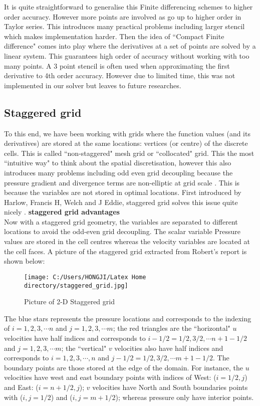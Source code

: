 It is quite straightforward to generalise this Finite differencing schemes to higher order accuracy. However more points are involved as go up to higher order in Taylor series. This introduces many practical problems including larger stencil which makes implementation harder. Then the idea of ``Compact Finite difference" comes into play where the derivatives at a set of points are solved by a linear system. This guarantees high order of accuracy without working with too many points. A 3 point stencil is often used when approximating the first derivative to 4th order accuracy. However due to limited time, this was not implemented in our solver but leaves to future researches.

\subsection{Staggered grid}
To this end, we have been working with grids where the function values (and its derivatives) are stored at the same locations: vertices (or centre) of the discrete cells. This is called ``non-staggered" mesh grid or ``collocated" grid. This the most ``intuitive way" to think about the spatial discretisation, however this also introduces many problems including odd even grid decoupling because the pressure gradient and divergence terms are non-elliptic at grid scale \cite{armfield2000fractional}. This is because the variables are not stored in optimal locations. First introduced by Harlow, Francis H, Welch and J Eddie, staggered grid solves this issue quite nicely \cite{harlow1965numerical}. \textbf{staggered grid advantages}\\

Now with a staggered grid geometry, the variables are separated to different locations to avoid the odd-even grid decoupling. The scalar variable Pressure values are stored in the cell centres whereas the velocity variables are located at the cell faces. A picture of the staggered grid extracted from Robert's report is shown below:

\begin{figure}[H]
	\centering
	\texttt{[image: C:/Users/HONGJI/Latex Home directory/staggered\_grid.jpg]}
	\caption{Picture of 2-D Staggered grid}\label{fig:6.1}
\end{figure}
The blue stars represents the pressure locations and corresponds to the indexing of $i = 1,2,3,\cdots n$ and $j = 1,2,3,\cdots m$; the red triangles are the ``horizontal" $u$ velocities have half indices and corresponds to $i-1/2 = 1/2, 3/2, \cdots n+1-1/2$ and $j=1,2,3,\cdots m$; the ``vertical" $v$ velocities also have half indices and corresponds to $i = 1,2,3,\cdots, n$ and $j-1/2 = 1/2, 3/2, \cdots m+1-1/2$. The boundary points are those stored at the edge of the domain. For instance, the $u$ velocities have west and east boundary points with indices of West: ($i=1/2,j$) and East: ($i=n+1/2,j$); $v$ velocities have North and South boundaries points with ($i,j=1/2$) and ($i,j=m+1/2$); whereas pressure only have interior points.\\

